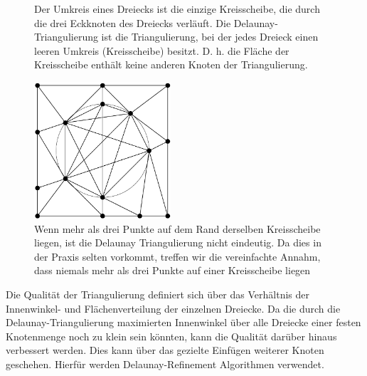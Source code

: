 \begin{figure}[H]%
    \centering
  
  \caption{Der Umkreis eines Dreiecks ist die einzige Kreisscheibe, die durch die drei Eckknoten des Dreiecks verläuft. Die Delaunay-Triangulierung ist die Triangulierung, bei der jedes Dreieck einen leeren Umkreis (Kreisscheibe) besitzt. D. h. die Fläche der Kreisscheibe enthält keine anderen Knoten der Triangulierung. \cite{Gjacquenot:2013:delaunay-circumcircles}}
  \label{fig:delaunay_umkreis}
\end{figure}
    
    
\begin{figure}[H]
    \centering
    \includegraphics[width=2in]{images/Bildschirmfoto von 2021-11-27 22-34-40.png}
    \caption{ Wenn mehr als drei Punkte auf dem Rand derselben Kreisscheibe liegen, ist die Delaunay Triangulierung nicht eindeutig. Da dies in der  Praxis selten vorkommt, treffen wir die vereinfachte Annahm, dass niemals mehr als drei Punkte auf einer Kreisscheibe liegen\cite{shewchuk:1997:delaunay} }
    \label{fig:eindeutig}
\end{figure}
    
\newpage

Die Qualität der Triangulierung definiert sich über das Verhältnis der  Innenwinkel- und Flächenverteilung der einzelnen Dreiecke. 
Da die durch die Delaunay-Triangulierung maximierten Innenwinkel über alle Dreiecke einer festen Knotenmenge noch zu klein sein könnten, 
kann die Qualität darüber hinaus verbessert werden. Dies kann über das gezielte Einfügen weiterer Knoten geschehen. Hierfür werden Delaunay-Refinement Algorithmen verwendet.\\

 





